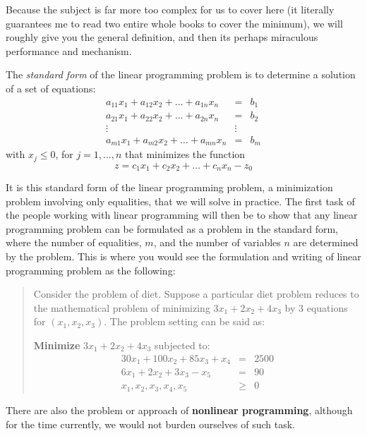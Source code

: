 Because the subject is far more too complex for us to cover here (it literally guarantees me to read two entire whole books to cover the minimum), we will roughly give you the general definition, and then its perhaps miraculous performance and mechanism. 

\begin{definition}
    The \textit{standard form} of the linear programming problem is to determine a solution of a set of equations:
    \begin{equation}
        \begin{matrix}
            a_{11}x_1 + a_{12}x_{2} + \dots + a_{1n}x_{n} & = & b_{1}\\
            a_{21}x_1 + a_{22}x_{2} + \dots + a_{2n}x_{n} & = & b_{2}\\
            \vdots & \vdots & \\
            a_{m1}x_1 + a_{m2}x_{2} + \dots + a_{mn}x_{n} & = & b_{m}
        \end{matrix}
    \end{equation}
    with $x_{j}\leq 0$, for $j=1,\dots,n$ that minimizes the function 
    \begin{equation}
        z = c_{1}x_{1} + c_{2}x_{2} + \dots + c_{n}x_{n} - z_{0}
    \end{equation}
\end{definition}

It is this standard form of the linear programming problem, a minimization problem involving only equalities, that we will solve in practice. The first task of the people working with linear programming will then be to show that any linear programming problem can be formulated as a problem in the standard form, where the number of equalities, $m$, and the number of variables $n$ are determined by the problem. This is where you would see the formulation and writing of linear programming problem as the following: 
\begin{quote}
    Consider the problem of diet. Suppose a particular diet problem reduces to the mathematical problem of minimizing $3x_{1}+2x_{2}+4x_{3}$ by 3 equations for $(x_{1},x_{2},x_{3})$. The problem setting can be said as: 
    \vspace{2mm}

    \textbf{Minimize} $3x_{1}+2x_{2}+4x_{3}$ subjected to: 
    \begin{equation*}
        \begin{matrix}
            30x_{1} + 100x_{2} + 85x_{3} + x_{4} & = & 2500\\
            6x_{1} + 2x_{2} + 3x_{3} - x_{5} & = & 90 \\
            x_{1}, x_{2}, x_{3},x_{4},x_{5} & \geq & 0
        \end{matrix}
    \end{equation*}
\end{quote}
There are also the problem or approach of \textbf{nonlinear programming}, although for the time currently, we would not burden ourselves of such task. 


